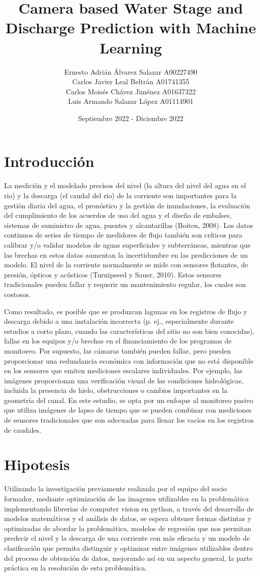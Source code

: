 \documentclass{article}
\title{Camera based Water Stage and Discharge Prediction with Machine Learning}
\author{
Ernesto Adrián Álvarez Salazar  A00227490\\
Carlos Javier Leal Beltrán  A01741355\\
Carlos Moisés Chávez Jiménez  A01637322\\
Luis Armando Salazar López  A01114901\\
}
\date{Septiembre 2022 - Diciembre 2022}
\begin{document}
\maketitle

\section{Introducción}

La medición y el modelado precisos del nivel (la altura del nivel del agua en el rio) y la descarga (el caudal del rio) de la corriente son importantes para la gestión diaria del agua, el pronóstico y la gestión de inundaciones, la evaluación del cumplimiento de los acuerdos de uso del agua y el diseño de embalses, sistemas de suministro de agua, puentes y alcantarillas (Boiten, 2008). Los datos continuos de series de tiempo de medidores de flujo también son críticos para calibrar y/o validar modelos de aguas superficiales y subterráneas, mientras que las brechas en estos datos aumentan la incertidumbre en las predicciones de un modelo. 
El nivel de la corriente normalmente se mide con sensores flotantes, de presión, ópticos y acústicos (Turnipseed y Sauer, 2010).  Estos sensores tradicionales pueden fallar y requerir un mantenimiento regular, los cuales son costosos.  

Como resultado, es posible que se produzcan lagunas en los registros de flujo y descarga debido a una instalación incorrecta (p. ej., especialmente durante estudios a corto plazo, cuando las características del sitio no son bien conocidas), fallas en los equipos y/o brechas en el financiamiento de los programas de monitoreo.  Por supuesto, las cámaras también pueden fallar, pero pueden proporcionar una redundancia económica con información que no está disponible en los sensores que emiten mediciones escalares individuales.  Por ejemplo, las imágenes proporcionan una verificación visual de las condiciones hidrológicas, incluida la presencia de hielo, obstrucciones o cambios importantes en la geometría del canal.  En este estudio, se opta por un enfoque al monitoreo pasivo que utiliza imágenes de lapso de tiempo que se pueden combinar con mediciones de sensores tradicionales que son adecuadas para llenar los vacíos en los registros de caudales.

\section{ Hipotesis}

Utilizando la investigación previamente realizada por el equipo del socio formador, mediante optimización de las imagenes utilizables en la problemática implementando librerias de computer vision en python, a través del desarrollo de modelos matemáticos y  el análisis de datos, se espera obtener formas distintas y optimizadas de abordar la problemática, modelos de regresión que nos permitan predecir el nivel y la descarga de una corriente con más eficacia y un modelo de clasificación que permita distinguir y optimizar entre imágenes utilizables dentro del proceso de obtención de datos, mejorando así en un aspecto general, la parte práctica en la resolución de esta problemática. 
\end{document}
